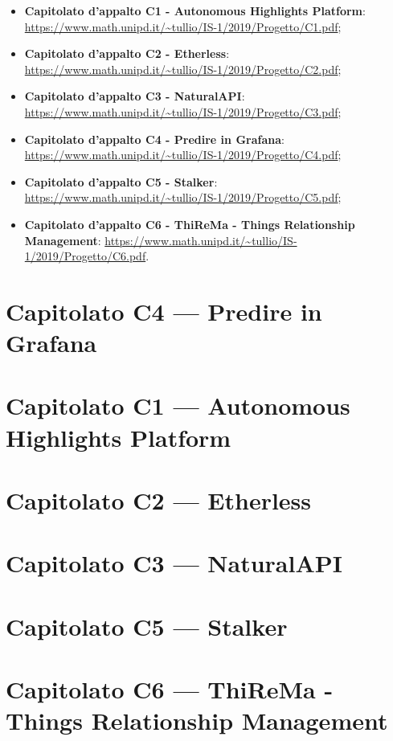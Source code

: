 \documentclass{article}
\begin{document}
\begin{itemize}
  \item \textbf{Capitolato d'appalto C1 - Autonomous Highlights Platform}: \url{https://www.math.unipd.it/~tullio/IS-1/2019/Progetto/C1.pdf};
  \item \textbf{Capitolato d'appalto C2 - Etherless}: \url{https://www.math.unipd.it/~tullio/IS-1/2019/Progetto/C2.pdf};
  \item \textbf{Capitolato d'appalto C3 - NaturalAPI}: \url{https://www.math.unipd.it/~tullio/IS-1/2019/Progetto/C3.pdf};
  \item \textbf{Capitolato d'appalto C4 - Predire in Grafana}: \url{https://www.math.unipd.it/~tullio/IS-1/2019/Progetto/C4.pdf};
  \item \textbf{Capitolato d'appalto C5 - Stalker}: \url{https://www.math.unipd.it/~tullio/IS-1/2019/Progetto/C5.pdf};
  \item \textbf{Capitolato d'appalto C6 - ThiReMa - Things Relationship Management}: \url{https://www.math.unipd.it/~tullio/IS-1/2019/Progetto/C6.pdf}.
\end{itemize}

\newpage
\section{Capitolato C4 --- Predire in Grafana}%
\label{sec:c4}


\newpage
\section{Capitolato C1 --- Autonomous Highlights Platform}%
\label{sec:c1}


\newpage
\section{Capitolato C2 --- Etherless}%
\label{sec:c2}


\newpage
\section{Capitolato C3 ---  NaturalAPI}%
\label{sec:c3}


\newpage
\section{Capitolato C5 --- Stalker}%
\label{sec:c5}


\newpage
\section{Capitolato C6 --- ThiReMa - Things Relationship Management}%
\label{sec:c6}

\end{document}
